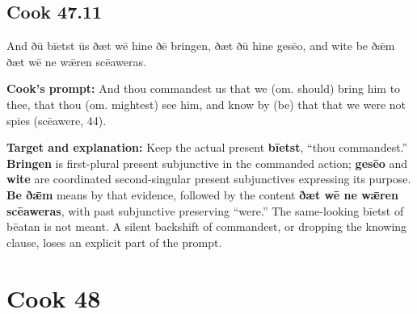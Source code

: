 \par\begin{minipage}{\linewidth}\raggedright
\subsection*{Cook 47.11}

And ðū bīetst ūs ðæt wē hine ðē bringen, ðæt ðū hine gesēo, and wite be ðǣm ðæt wē ne wǣren scēaweras.

\textbf{Cook’s prompt:} And thou commandest us that we (om. should) bring him to thee, that thou (om. mightest) see him, and know by (be) that that we were not spies (scēawere, 44).

\textbf{Target and explanation:} Keep the actual present \textbf{bīetst}, “thou commandest.” \textbf{Bringen} is first-plural present subjunctive in the commanded action; \textbf{gesēo} and \textbf{wite} are coordinated second-singular present subjunctives expressing its purpose. \textbf{Be ðǣm} means by that evidence, followed by the content \textbf{ðæt wē ne wǣren scēaweras}, with past subjunctive preserving “were.” The same-looking bīetst of bēatan is not meant. A silent backshift of commandest, or dropping the knowing clause, loses an explicit part of the prompt.

\end{minipage}\par\addvspace{4pt}

\clearpage
\section*{Cook 48}

